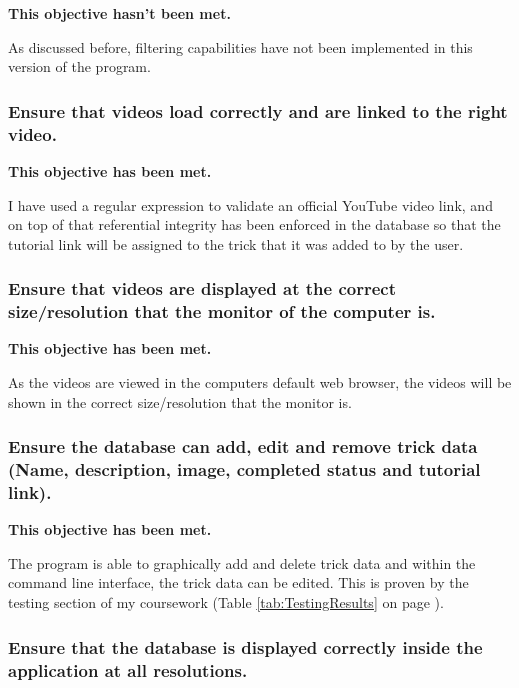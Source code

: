 \textbf{This objective hasn't been met.}

As discussed before, filtering capabilities have not been implemented in this version of the program.




\subsubsection {Ensure that videos load correctly and are linked to the right video.} %

\textbf{This objective has been met.}

 I have used a regular expression to validate an official YouTube video link, and on top of that referential integrity has been enforced in the database so that the tutorial link will be assigned to the trick that it was added to by the user. 




\subsubsection {Ensure that videos are displayed at the correct size/resolution that the monitor of the computer is.} %

\textbf{This objective has been met.}

As the videos are viewed in the computers default web browser, the videos will be shown in the correct size/resolution that the monitor is.



\subsubsection {Ensure the database can add, edit and remove trick data (Name, description, image, completed status and tutorial link).}

\textbf{This objective has been met.}

The program is able to graphically add and delete trick data and within the command line interface, the trick data can be edited. This is proven by the testing section of my coursework (Table \ref{tab:TestingResults} on page \pageref{tab:TestingResults}).

\subsubsection {Ensure that the database is displayed correctly inside the application at all resolutions.}

